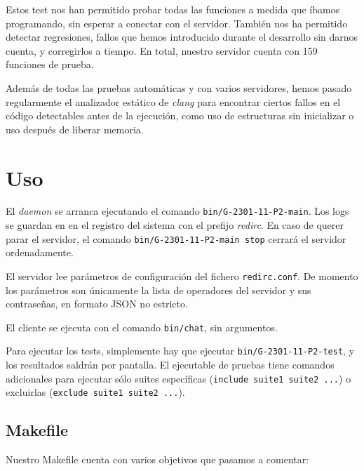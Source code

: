 \documentclass{article}
\begin{document}
Estos test nos han permitido probar todas las funciones a medida que íbamos programando, sin esperar a conectar con el servidor. También nos ha permitido detectar regresiones, fallos que hemos introducido durante el desarrollo sin darnos cuenta, y corregirlos a tiempo. En total, nuestro servidor cuenta con 159 funciones de prueba.

Además de todas las pruebas automáticas y con varios servidores, hemos pasado regularmente el analizador estático de \textit{clang} para encontrar ciertos fallos en el código detectables antes de la ejecución, como uso de estructuras sin inicializar o uso después de liberar memoria.

\section{Uso}

El \textit{daemon} se arranca ejecutando el comando \texttt{bin/G-2301-11-P2-main}. Los logs se guardan en en el registro del sistema con el prefijo \textit{redirc}. En caso de querer parar el servidor, el comando \texttt{bin/G-2301-11-P2-main stop} cerrará el servidor ordenadamente.

El servidor lee parámetros de configuración del fichero \texttt{redirc.conf}. De momento los parámetros son únicamente la lista de operadores del servidor y sus contraseñas, en formato JSON no estricto.

El cliente se ejecuta con el comando \texttt{bin/chat}, sin argumentos.

Para ejecutar los tests, simplemente hay que ejecutar \texttt{bin/G-2301-11-P2-test}, y los resultados saldrán por pantalla. El ejecutable de pruebas tiene comandos adicionales para ejecutar sólo suites específicas (\texttt{include suite1 suite2 ...}) o excluirlas (\texttt{exclude suite1 suite2 ...}).

\subsection{Makefile}

Nuestro Makefile cuenta con varios objetivos que pasamos a comentar:
\end{document}
